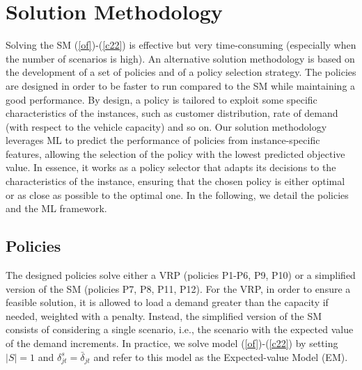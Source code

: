 \documentclass[preprint,11pt,authoryear]{elsarticle}
\begin{document}
\section{Solution Methodology}\label{method}
Solving the SM (\ref{of})-(\ref{c22}) is effective but very time-consuming (especially when the number of scenarios is high). An alternative solution methodology is based on the development of a set of policies and of a policy selection strategy. The policies are designed in order to be faster to run compared to the SM while maintaining a good performance. By design, a policy is tailored to exploit some specific characteristics of the instances, such as customer distribution, rate of demand (with respect to the vehicle capacity) and so on. 
Our solution methodology leverages ML to predict the performance of policies from instance-specific features, allowing the selection of the policy with the lowest predicted objective value. In essence, it works as a policy selector that adapts its decisions to the characteristics of the instance, ensuring that the chosen policy is either optimal or as close as possible to the optimal one. In the following, we detail the policies and the ML framework.


\subsection{Policies}\label{sec: policies}
The designed policies solve either a VRP (policies P1-P6, P9, P10) or a simplified version of the SM (policies P7, P8, P11, P12). 
For the VRP, in order to ensure
a feasible solution, it is allowed to load a demand greater than the capacity if needed, weighted with a penalty. Instead, the simplified version of the SM consists of considering a single scenario, i.e., the scenario with the expected value of the demand increments. In practice, we solve model (\ref{of})-(\ref{c22}) by setting $|S|=1$ and
$\delta^s_{jt} = \bar\delta_{jt}$ and refer to this model as the Expected-value Model (EM). 
\end{document}

